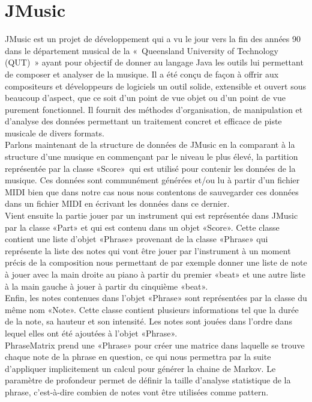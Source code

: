 \documentclass[12pt, a4paper]{article}
\begin{document}
        
    \section{JMusic}
        JMusic est un projet de développement qui a vu le jour vers la fin des années 90 dans le département musical de la « Queensland University of Technology (QUT) » ayant pour objectif de donner au langage Java les outils lui permettant de composer et analyser de la musique. Il a été conçu de façon à offrir aux compositeurs et développeurs de logiciels un outil solide, extensible et ouvert sous beaucoup d’aspect, que ce soit d’un point de vue objet ou d’un point de vue purement fonctionnel. Il fournit des méthodes d’organisation, de manipulation et d’analyse des données permettant un traitement concret et efficace de piste musicale de divers formats.\\
        
        Parlons maintenant de la structure de données de JMusic en la comparant à la structure d’une musique en commençant par le niveau le plus élevé, la partition représentée par la classe «Score» qui est utilisé pour contenir les données de la musique. Ces données sont communément générées et/ou lu à partir d’un fichier MIDI bien que dans notre cas nous nous contentons de sauvegarder ces données dans un fichier MIDI en écrivant les données dans ce dernier.\\
Vient ensuite la partie jouer par un instrument qui est représentée dans JMusic par la classe «Part» et qui est contenu dans un objet «Score». Cette classe contient une liste d’objet «Phrase» provenant de la classe «Phrase» qui représente la liste des notes qui vont être jouer par l’instrument à un moment précis de la composition nous permettant de par exemple donner une liste de note à jouer avec la main droite au piano à partir du premier «beat» et une autre liste à la main gauche à jouer à partir du cinquième «beat». \\
Enfin, les notes contenues dans l’objet «Phrase» sont représentées par la classe du même nom «Note». Cette classe contient plusieurs informations tel que la durée de la note, sa hauteur et son intensité. Les notes sont jouées dans l’ordre dans lequel elles ont été ajoutées à l’objet «Phrase».\\
        
        PhraseMatrix prend une «Phrase» pour créer une matrice dans laquelle se trouve chaque note de la phrase en question, ce qui nous permettra par la suite d’appliquer implicitement un calcul pour générer la chaine de Markov. Le paramètre de profondeur permet de définir la taille d'analyse statistique de la phrase, c'est-à-dire combien de notes vont être utilisées comme pattern.
        
\end{document}
